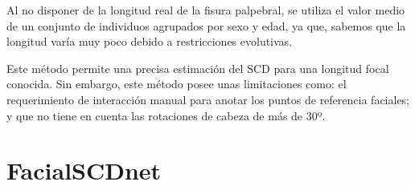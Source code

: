 Al no disponer de la longitud real de la fisura palpebral, se utiliza el valor medio de un conjunto de individuos agrupados por sexo y edad, ya que, sabemos que la longitud varía muy poco debido a restricciones evolutivas.

Este método permite una precisa estimación del SCD para una longitud focal conocida. Sin embargo, este método posee unas limitaciones como: el requerimiento de interacción manual para anotar los puntos de referencia faciales; y que no tiene en cuenta las rotaciones de cabeza de más de 30º.

\section{FacialSCDnet}


